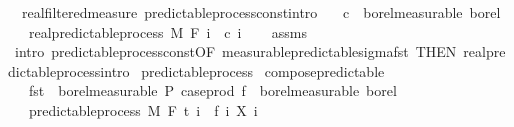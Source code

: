 \begin{isabellebody}
\endisatagproof
{\isafoldproof}%
%
\isadelimproof
\isanewline
%
\endisadelimproof
\isanewline
{}\isamarkupfalse%
\ {\isacharparenleft}{\kern0pt}\ real{\isacharunderscore}{\kern0pt}filtered{\isacharunderscore}{\kern0pt}measure{\isacharparenright}{\kern0pt}\ predictable{\isacharunderscore}{\kern0pt}process{\isacharunderscore}{\kern0pt}const{\isacharprime}{\kern0pt}{\isacharbrackleft}{\kern0pt}intro{\isacharbrackright}{\kern0pt}{\isacharcolon}{\kern0pt}\isanewline
\ \ \ {\isachardoublequoteopen}c\ {\isasymin}\ borel{\isacharunderscore}{\kern0pt}measurable\ borel{\isachardoublequoteclose}\isanewline
\ \ \ {\isachardoublequoteopen}real{\isacharunderscore}{\kern0pt}predictable{\isacharunderscore}{\kern0pt}process\ M\ F\ {\isacharparenleft}{\kern0pt}{\isasymlambda}i\ {\isacharunderscore}{\kern0pt}{\isachardot}{\kern0pt}\ c\ i{\isacharparenright}{\kern0pt}{\isachardoublequoteclose}\isanewline
%
\isadelimproof
\ \ %
\endisadelimproof
%
\isatagproof
{}\isamarkupfalse%
\ assms\ \isamarkupfalse%
\ {\isacharparenleft}{\kern0pt}intro\ predictable{\isacharunderscore}{\kern0pt}process{\isacharunderscore}{\kern0pt}const{\isacharbrackleft}{\kern0pt}OF\ measurable{\isacharunderscore}{\kern0pt}predictable{\isacharunderscore}{\kern0pt}sigma{\isacharunderscore}{\kern0pt}fst{\isacharprime}{\kern0pt}{\isacharcomma}{\kern0pt}\ THEN\ real{\isacharunderscore}{\kern0pt}predictable{\isacharunderscore}{\kern0pt}process{\isachardot}{\kern0pt}intro{\isacharbrackright}{\kern0pt}{\isacharparenright}{\kern0pt}%
\endisatagproof
{\isafoldproof}%
%
\isadelimproof
\isanewline
%
\endisadelimproof
\isanewline
{}\isamarkupfalse%
\ predictable{\isacharunderscore}{\kern0pt}process\isanewline
{}\isanewline
\isanewline
{}\isamarkupfalse%
\ compose{\isacharunderscore}{\kern0pt}predictable{\isacharcolon}{\kern0pt}\isanewline
\ \ \ {\isachardoublequoteopen}fst\ {\isasymin}\ borel{\isacharunderscore}{\kern0pt}measurable\ {\isasymSigma}\isactrlsub P{\isachardoublequoteclose}\ {\isachardoublequoteopen}case{\isacharunderscore}{\kern0pt}prod\ f\ {\isasymin}\ borel{\isacharunderscore}{\kern0pt}measurable\ borel{\isachardoublequoteclose}\isanewline
\ \ \ {\isachardoublequoteopen}predictable{\isacharunderscore}{\kern0pt}process\ M\ F\ t\ {\isacharparenleft}{\kern0pt}{\isasymlambda}i\ {\isasymxi}{\isachardot}{\kern0pt}\ {\isacharparenleft}{\kern0pt}f\ i{\isacharparenright}{\kern0pt}\ {\isacharparenleft}{\kern0pt}X\ i\ {\isasymxi}{\isacharparenright}{\kern0pt}{\isacharparenright}{\kern0pt}{\isachardoublequoteclose}\isanewline

\end{isabellebody}
